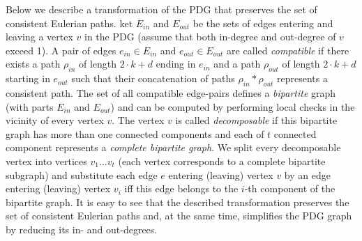  Below we describe a transformation of the PDG that preserves the set
 of consistent Eulerian paths.  ket $E_{in}$ and $E_{out}$ be the sets
 of edges entering and leaving a vertex $v$ in the PDG (assume that
 both in-degree and out-degree of $v$ exceed 1). A pair of edges
 $e_{in} \in E_{in}$ and $e_{out} \in E_{out}$ are called
 \textit{compatible} if there exists a path $\rho_{in}$ of length $2
 \cdot k +d$ ending in $e_{in}$ and a path $\rho_{out}$ of length $2
 \cdot k +d$ starting in $e_{out}$ such that their concatenation of
 paths $\rho_{in} * \rho_{out}$ represents a consistent path. The set
 of all compatible edge-pairs defines a {\em bipartite} graph (with
 parts $E_{in}$ and $E_{out}$) and can be computed by performing local
 checks in the vicinity of every vertex $v$. The vertex $v$ is called
 {\em decomposable} if this bipartite graph has more than one
 connected components and each of $t$ connected component represents a
 {\em complete bipartite graph}. We split every decomposable vertex
 into vertices $v_1 \ldots v_t$ (each vertex corresponds to a complete
 bipartite subgraph) and substitute each edge $e$ entering (leaving)
 vertex $v$ by an edge entering (leaving) vertex $v_i$ iff this edge
 belongs to the $i$-th component of the bipartite graph.  It is easy
 to see that the described transformation preserves the set of
 consistent Eulerian paths and, at the same time, simplifies the PDG
 graph by reducing its in- and out-degrees.





